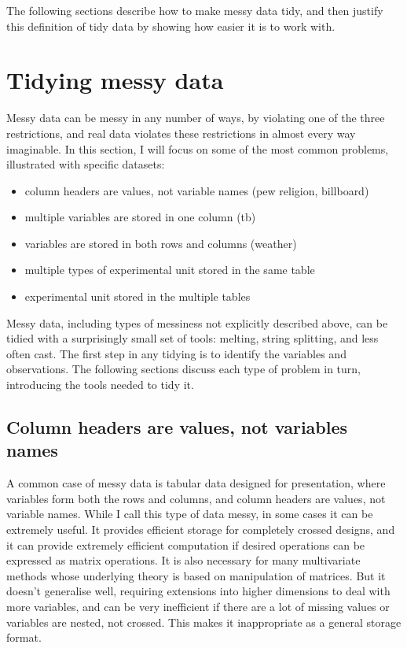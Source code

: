 \documentclass[oneside]{article}
\begin{document}
The following sections describe how to make messy data tidy, and then justify this definition of tidy data by showing how easier it is to work with.

\section{Tidying messy data}

Messy data can be messy in any number of ways, by violating one of the three restrictions, and real data violates these restrictions in almost every way imaginable. In this section, I will focus on some of the most common problems, illustrated with specific datasets:

\begin{itemize}

\item column headers are values, not variable names (pew religion, billboard)
\item multiple variables are stored in one column (tb)
\item variables are stored in both rows and columns (weather)
\item multiple types of experimental unit stored in the same table
\item experimental unit stored in the multiple tables
\end{itemize}

Messy data, including types of messiness not explicitly described above, can be tidied with a surprisingly small set of tools: melting, string splitting, and less often cast. The first step in any tidying is to identify the variables and observations. The following sections discuss each type of problem in turn, introducing the tools needed to tidy it.

\subsection{Column headers are values, not variables names}

A common case of messy data is tabular data designed for presentation, where variables form both the rows and columns, and column headers are values, not variable names. While I call this type of data messy, in some cases it can be extremely useful. It provides efficient storage for completely crossed designs, and it can provide extremely efficient computation if desired operations can be expressed as matrix operations. It is also necessary for many multivariate methods whose underlying theory is based on manipulation of matrices. But it doesn't generalise well, requiring extensions into higher dimensions to deal with more variables, and can be very inefficient if there are a lot of missing values or variables are nested, not crossed. This makes it inappropriate as a general storage format.
\end{document}
